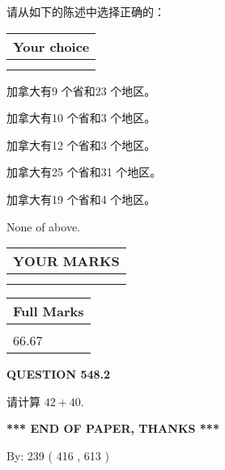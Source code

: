 \documentclass{ctexart}
\begin{document}
  
请从如下的陈述中选择正确的：
  
  
\noindent\hspace{3.0in} \begin{tabular}{|l|}
\hline
Your choice \\
\hline
 \\ 
 \\ 
\hline
\end{tabular}
  
  
 
 
加拿大有9 个省和23 个地区。
 
 
加拿大有10 个省和3 个地区。
 
 
加拿大有12 个省和3 个地区。
 
 
加拿大有25 个省和31 个地区。
 
 
加拿大有19 个省和4 个地区。
 
 
 None of above.
 
 
  
\vspace{0.2in}
  
\noindent\begin{tabular}{|l|}
\hline
 YOUR MARKS  \\
\hline
 \\ 
 \\ 
\hline
\end{tabular}
\hspace{0.05in} \begin{tabular}{|l|}
\hline
 Full Marks  \\
\hline
 \\ 
66.67 \\
\hline
\end{tabular}
{\textbf{\Large{QUESTION
548.2 
}}}
  
  
 
请计算 $ %
42 +  %
40 $.
 

 

 
   
   
 \vspace{0.2in}
 
   
   
   
   
\vspace{1.0in} 
{\textbf{\large{ *** END OF PAPER, THANKS *** }}} 
   
   
\hspace{1.0in} By: 
 239 ( 416 ,  613 )
   
\end{document}
